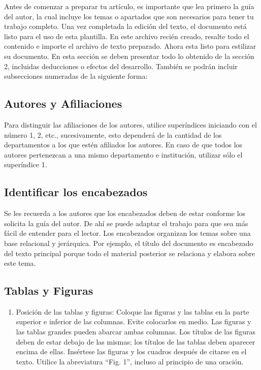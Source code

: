     Antes de comenzar a preparar tu artículo, es importante que lea primero la guía del autor, la cual incluye los temas o apartados que son necesarios para tener tu trabajo completo.
    Una vez completada la edición del texto, el documento está listo para el uso de esta plantilla. En este archivo recién creado, resalte todo el contenido e importe el archivo de texto preparado. Ahora esta listo para estilizar su documento.
    En esta sección se deben presentar todo lo obtenido de la sección 2, incluidas deducciones o efectos del desarrollo. También se podrán incluir subsecciones numeradas de la siguiente forma:
    
    \subsection{Autores y Afiliaciones}
    
    Para distinguir las afiliaciones de los autores, utilice superíndices iniciando con el número 1, 2, etc., sucesivamente, esto dependerá de la cantidad de los departamentos a los que estén afiliados los autores. En caso de que todos los autores pertenezcan a una mismo departamento e institución, utilizar sólo el superíndice 1. 
    
    \subsection{Identificar los encabezados}
    
    Se les recuerda a los autores que los encabezados deben de estar conforme los solicita la guía del autor. De ahí se puede adaptar el trabajo para que sea más fácil de entender para el lector.
    Los encabezados organizan los temas sobre una base relacional y jerárquica. Por ejemplo, el título del documento es encabezado del texto principal porque todo el material posterior se relaciona y elabora sobre este tema. 
    
    \subsection{Tablas y Figuras}
    
    \begin{enumerate}
        \item Posición de las tablas y figuras: Coloque las figuras y las tablas en la parte superior e inferior de las columnas. Evite colocarlos en medio. Las figuras y las tablas grandes pueden abarcar ambas columnas. Los títulos de las figuras deben de estar debajo de las mismas; los títulos de las tablas deben aparecer encima de ellas. Insértese las figuras y los cuadros después de citarse en el texto. Utilice la abreviatura “Fig. 1”, incluso al principio de una oración. 
    \end{enumerate}
    
